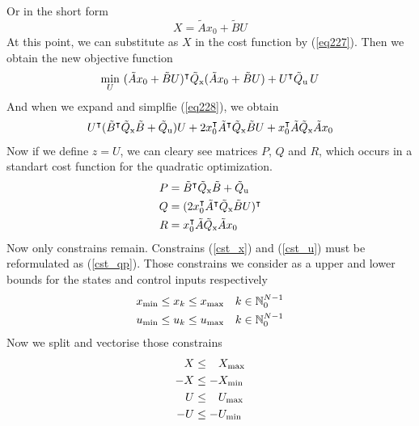 Or in the short form
\begin{equation}\label{eq227}
	X = \tilde{A}x_0 + \tilde{B}U
\end{equation}
At this point, we can substitute as $X$ in the cost function by (\ref{eq227}). Then we obtain the new objective function
\begin{equation}\label{eq228}
	\min_{U}\ (\tilde{A}x_0 + \tilde{B}U)^\intercal\tilde{Q} _{\text{x}}(\tilde{A}x_0 + \tilde{B}U) + U^\intercal\tilde{Q} _{\text{u}}\,U\\
\end{equation}
And when we expand and simplfie (\ref{eq228}), we obtain
\begin{equation}
	U^\intercal(\tilde{B}^\intercal\tilde{Q} _{\text{x}}\tilde{B} + \tilde{Q} _{\text{u}})U + 2x_0^\intercal\tilde{A}^\intercal\tilde{Q} _{\text{x}}\tilde{B}U + x_0^\intercal\tilde{A}\tilde{Q} _{\text{x}}\tilde{A}x_0
\end{equation}
Now if we define $z = U$, we can cleary see matrices $P$, $Q$ and $R$, which occurs in a standart cost function for the quadratic optimization.
\begin{subequations}
	\begin{align}
		P &= \tilde{B}^\intercal\tilde{Q} _{\text{x}}\tilde{B} + \tilde{Q} _{\text{u}}\\
		Q &= (2x_0^\intercal\tilde{A}^\intercal\tilde{Q} _{\text{x}}\tilde{B}U)^\intercal\\
		R &= x_0^\intercal\tilde{A}\tilde{Q} _{\text{x}}\tilde{A}x_0
	\end{align}
\end{subequations}
Now only constrains remain. Constrains (\ref{cst_x}) and (\ref{cst_u}) must be reformulated as (\ref{cst_qp}). Those constrains we consider as a upper and lower bounds for the states and control inputs respectively
\begin{subequations}
	\begin{align}
		x _{\text{min}} &\leq x_k \leq x _{\text{max}} \quad k \in \mathbb{N}_0^{N-1}\\
		u _{\text{min}} &\leq u_k \leq u _{\text{max}} \quad k \in \mathbb{N}_0^{N-1}
	\end{align}
\end{subequations}
Now we split and vectorise those constrains
\begin{subequations}
\begin{align}
	X &\leq \ \; \, X _{\text{max}}\\
	-X &\leq -X _{\text{min}}\\
	U &\leq \ \; \, U _{\text{max}}\\
	-U &\leq -U _{\text{min}}
\end{align}
\end{subequations}
